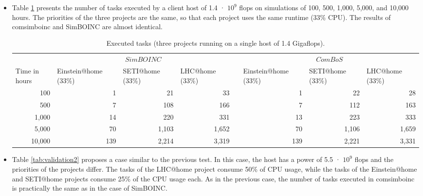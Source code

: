 \begin{itemize}
\item 
Table \ref{tab:validation1} presents the number of tasks executed by a client host of 1.4 · $10^{9}$ \acrshort{flops} on simulations of 100, 500, 1,000, 5,000, and 10,000 hours. The priorities of the three projects are the same, so that each project uses the same runtime (33\% CPU). The results of \gls{comsimboinc} and SimBOINC are almost identical.

\begin{table}[htbp]
\centering
{}
\begin{tabular}{@{}p{1.3cm}p{2.4cm}p{1.8cm}p{1.8cm}p{0.1cm}p{2.4cm}p{1.8cm}p{2.0cm}@{}}
\toprule
& \multicolumn{3}{c}{$SimBOINC$} & & \multicolumn{3}{c}{$ComBoS$}\\
\cmidrule{2-4} \cmidrule{6-8}
Time in hours & Einstein@home (33\%) & SETI@home (33\%) & LHC@home (33\%) && Einstein@home (33\%) & SETI@home (33\%) & LHC@home (33\%)\\ 
\midrule
\multicolumn{1}{r}{100}			& \multicolumn{1}{r}{1}			& \multicolumn{1}{r}{21}			& \multicolumn{1}{r}{33}			&& \multicolumn{1}{r}{1}			& \multicolumn{1}{r}{22}			& \multicolumn{1}{r}{28}			\\
\multicolumn{1}{r}{500}			& \multicolumn{1}{r}{7}			& \multicolumn{1}{r}{108}	& \multicolumn{1}{r}{166}		&& \multicolumn{1}{r}{7}			& \multicolumn{1}{r}{112}		& \multicolumn{1}{r}{163}		\\ 
\multicolumn{1}{r}{1,000}		& \multicolumn{1}{r}{14}			& \multicolumn{1}{r}{220}		& \multicolumn{1}{r}{331}		&& \multicolumn{1}{r}{13}		& \multicolumn{1}{r}{223}		& \multicolumn{1}{r}{333}		\\
\multicolumn{1}{r}{5,000}		& \multicolumn{1}{r}{70}			& \multicolumn{1}{r}{1,103}		& \multicolumn{1}{r}{1,652}		&& \multicolumn{1}{r}{70}		& \multicolumn{1}{r}{1,106}		& \multicolumn{1}{r}{1,659}		\\
\multicolumn{1}{r}{10,000}		& \multicolumn{1}{r}{139}		& \multicolumn{1}{r}{2,214}		& \multicolumn{1}{r}{3,319}		&& \multicolumn{1}{r}{139}		& \multicolumn{1}{r}{2,221}		& \multicolumn{1}{r}{3,331}		\\
\bottomrule
\end{tabular}
\caption{Executed tasks (three projects running on a single host of 1.4 Giga\acrshort{flops}).}
\label{tab:validation1}
\end{table}

\item Table \ref{tab:validation2} proposes a case similar to the previous test. In this case, the host has a power of 5.5 · $10^{9}$ \acrshort{flops} and the priorities of the projects differ. The tasks of the LHC@home project consume 50\% of CPU usage, while the tasks of the Einstein@home and SETI@home projects consume 25\% of the CPU usage each. As in the previous case, the number of tasks executed in \gls{comsimboinc} is practically the same as in the case of SimBOINC.


\end{itemize}
